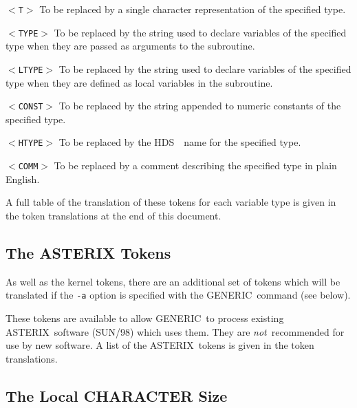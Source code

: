 \documentclass[twoside,11pt]{article}
\renewcommand{\_}{{\tt\char'137}}     %
\newcommand{\htmlref}[2]{#1}
\newcommand{\xref}[3]{#1}
\newcommand{\ASTERIX}{{\footnotesize ASTERIX}\normalsize}
\newcommand{\ASTERIXref}{\xref{\ASTERIX}{sun98}{}}
\newcommand{\GENERIC}{{\footnotesize GENERIC}\normalsize}
\newcommand{\HDS}{{\footnotesize HDS}\normalsize}
\newcommand{\HDSref}{\xref{\HDS}{sun92}{}~}
\newcommand{\latexelsehtml}[2]{#1}
\renewcommand{\latexelsehtml}[2]{#2}
\begin{document}
\begin{list}{}{\setlength{\labelwidth}{\numlen}\setlength{\leftmargin}{\numlen}
\addtolength{\leftmargin}{\labelsep}}

\item[{\tt $<$T$>$}] To be replaced by a single character representation
of the specified type.

\item[{\tt $<$TYPE$>$}] To be replaced by the string used to declare variables
of the specified type when they are passed as arguments to
the subroutine.

\item[{\tt $<$LTYPE$>$}] To be replaced by the string used to declare variables
of the specified type when they are defined as local variables
in the subroutine.

\item[{\tt $<$CONST$>$}] To be replaced by the string appended to numeric
constants of the specified type.

\item[{\tt $<$HTYPE$>$}] To be replaced by the \HDSref\ name for the specified
type.

\item[{\tt $<$COMM$>$}] To be replaced by a comment describing the specified type
in plain English.

\end{list}

A full table of the translation of these tokens for each variable type
is given in
\latexelsehtml{Appendix~\ref{ap_a}}{the
\htmlref{token translations}{ap_a}}
at the end of this document.

\subsection{The ASTERIX Tokens}

As well as the kernel tokens, there are an additional set of
tokens which will be translated if the {\tt -a} option is specified
with the \GENERIC\ command (see below).

These tokens are available to allow \GENERIC\ to process existing
\ASTERIXref\ software (SUN/98) which uses them.
They are {\em not}\ recommended for use by new software.
A list of the \ASTERIX\ tokens is given in
\latexelsehtml{Appendix~\ref{ap_a}}{the
\htmlref{token translations}{ap_a}}.

\subsection{The Local CHARACTER Size}
\end{document}
